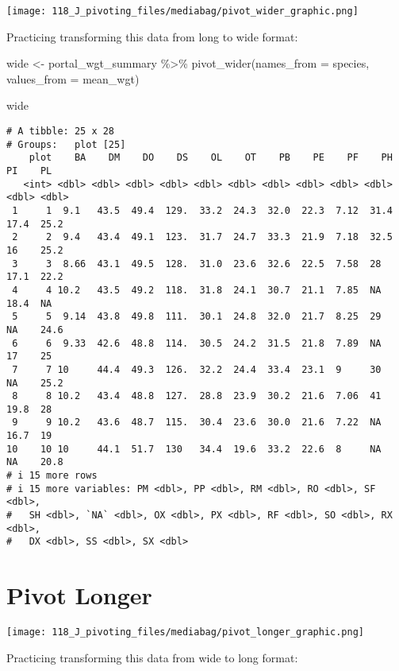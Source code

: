 \documentclass[
  letterpaper,
  DIV=11,
  numbers=noendperiod]{scrartcl}
\newenvironment{Shaded}{\begin{snugshade}}{\end{snugshade}}
\newcommand{\AttributeTok}[1]{\textcolor[rgb]{0.40,0.45,0.13}{#1}}
\newcommand{\FunctionTok}[1]{\textcolor[rgb]{0.28,0.35,0.67}{#1}}
\newcommand{\NormalTok}[1]{\textcolor[rgb]{0.00,0.23,0.31}{#1}}
\newcommand{\OtherTok}[1]{\textcolor[rgb]{0.00,0.23,0.31}{#1}}
\newcommand{\SpecialCharTok}[1]{\textcolor[rgb]{0.37,0.37,0.37}{#1}}
\begin{document}
\texttt{[image: 118\_J\_pivoting\_files/mediabag/pivot\_wider\_graphic.png]}

Practicing transforming this data from long to wide format:

\begin{Shaded}
\begin{Highlighting}[]
\NormalTok{wide }\OtherTok{\textless{}{-}}\NormalTok{ portal\_wgt\_summary }\SpecialCharTok{\%\textgreater{}\%} 
  \FunctionTok{pivot\_wider}\NormalTok{(}\AttributeTok{names\_from =}\NormalTok{ species, }\AttributeTok{values\_from =}\NormalTok{ mean\_wgt)}

\NormalTok{wide}
\end{Highlighting}
\end{Shaded}

\begin{verbatim}
# A tibble: 25 x 28
# Groups:   plot [25]
    plot    BA    DM    DO    DS    OL    OT    PB    PE    PF    PH    PI    PL
   <int> <dbl> <dbl> <dbl> <dbl> <dbl> <dbl> <dbl> <dbl> <dbl> <dbl> <dbl> <dbl>
 1     1  9.1   43.5  49.4  129.  33.2  24.3  32.0  22.3  7.12  31.4  17.4  25.2
 2     2  9.4   43.4  49.1  123.  31.7  24.7  33.3  21.9  7.18  32.5  16    25.2
 3     3  8.66  43.1  49.5  128.  31.0  23.6  32.6  22.5  7.58  28    17.1  22.2
 4     4 10.2   43.5  49.2  118.  31.8  24.1  30.7  21.1  7.85  NA    18.4  NA  
 5     5  9.14  43.8  49.8  111.  30.1  24.8  32.0  21.7  8.25  29    NA    24.6
 6     6  9.33  42.6  48.8  114.  30.5  24.2  31.5  21.8  7.89  NA    17    25  
 7     7 10     44.4  49.3  126.  32.2  24.4  33.4  23.1  9     30    NA    25.2
 8     8 10.2   43.4  48.8  127.  28.8  23.9  30.2  21.6  7.06  41    19.8  28  
 9     9 10.2   43.6  48.7  115.  30.4  23.6  30.0  21.6  7.22  NA    16.7  19  
10    10 10     44.1  51.7  130   34.4  19.6  33.2  22.6  8     NA    NA    20.8
# i 15 more rows
# i 15 more variables: PM <dbl>, PP <dbl>, RM <dbl>, RO <dbl>, SF <dbl>,
#   SH <dbl>, `NA` <dbl>, OX <dbl>, PX <dbl>, RF <dbl>, SO <dbl>, RX <dbl>,
#   DX <dbl>, SS <dbl>, SX <dbl>
\end{verbatim}

\hypertarget{pivot-longer}{%
\section{Pivot Longer}\label{pivot-longer}}

\texttt{[image: 118\_J\_pivoting\_files/mediabag/pivot\_longer\_graphic.png]}

Practicing transforming this data from wide to long format:
\end{document}
